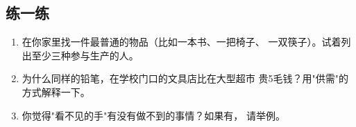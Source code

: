 \documentclass[a4paper,12pt]{ctexart}
\begin{document}
\subsection*{练一练}

\begin{enumerate}
  \item 在你家里找一件最普通的物品（比如一本书、一把椅子、
  一双筷子）。试着列出至少三种参与生产的人。
  \item 为什么同样的铅笔，在学校门口的文具店比在大型超市
  贵5毛钱？用"供需"的方式解释一下。
  \item 你觉得"看不见的手"有没有做不到的事情？如果有，
  请举例。
\end{enumerate}
\end{document}
